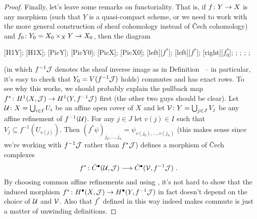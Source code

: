 \documentclass[a4paper,parskip=half,numbers=enddot, DIV=12]{scrreprt}
\begin{document}
\begin{proof}
	Finally, let's leave some remarks on functoriality. That is, if $f\colon Y\morphism X$ is any morphism (such that $Y$ is a quasi-compact scheme, or we need to work with the more general construction of sheaf cohomology instead of \v Cech cohomology) and $f_0\colon Y_0=X_0\times_XY\morphism X_0$, then the diagram
	\begin{diagram}
		[H1Y];
		[H1X];
		;
		[PicY0];
		;
		[PicX0];
		\scriptsize
		[$f^*$];
		[$f^*$];
		[right][$f_0^*$];
		;
		;
		;
		;
	\end{diagram}
	(in which $f^{-1}\mathcal{J}$ denotes the sheaf inverse image as in Definition~ -- in particular, it's easy to check that $Y_0=V(f^{-1}\mathcal{J})$ holds) commutes and has exact rows. To see why this works, we should probably explain the pullback map $f^*\colon H^1(X,\Jj)\morphism H^1(Y,f^{-1}\Jj)$ first (the other two guys should be clear). Let $\mathcal{U}\colon X=\bigcup_{i\in I}U_i$ be an affine open cover of $X$ and let $\mathcal{V}\colon Y=\bigcup_{j\in J} V_j$ be any affine refinement of $f^{-1}(\mathcal{U})$. For any $j\in J$ let $v(j)\in I$ such that $V_j\subseteq f^{-1}(U_{v(j)})$. Then $(f^*\psi)_{j_0,\ldots,j_n}=\psi_{v(j_0),\ldots,v(j_n)}$ (this makes sense since we're working with $f^{-1}\mathcal{J}$ rather than $f^*\mathcal{J}$) defines a morphism of \v Cech complexes
	\begin{align*}
		f^*\colon \check{C}^\bullet(\Uu,\Jj)\morphism\check{C}^\bullet(\Vv,f^{-1}\Jj)\;.
	\end{align*}
	By choosing common affine refinements and using \cite[Lemma~1.2.1]{alggeo2}, it's not hard to show that the induced morphism $f^*\colon H^\bullet(X,\Jj)\morphism H^\bullet(Y,f^{-1}\Jj)$ in fact doesn't depend on the choice of $\mathcal{U}$ and $\mathcal{V}$. Also that $f^*$ defined in this way indeed makes  commute is just a matter of unwinding definitions.
\end{proof}
\end{document}

